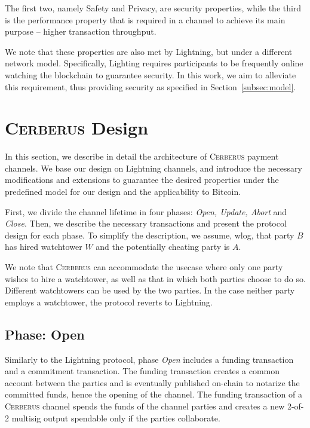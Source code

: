 \documentclass[runningheads]{llncs}
\newcommand{\authnote}[3]{{ \footnotesize \bf{#1[#2: #3]~}}} %
\newcommand{\edit}[1]{\authnote{\color{blue}}{edit}{#1}}
\newcommand{\sys}{\textsc{Cerberus}\xspace}
\begin{document}
The first two, namely Safety and Privacy, are security properties, while the third is the performance property that is required in a channel to achieve its main purpose -- higher transaction throughput.

We note that these properties are also met by Lightning, but under a different network model. Specifically, Lighting requires participants to be frequently online watching the blockchain to guarantee security. In this work, we aim to alleviate this requirement, thus providing security as specified in Section~\ref{subsec:model}.






\section{\sys Design}\label{sec:design}

In this section, we describe in detail the architecture of \sys payment channels. We base our design on Lightning channels, and introduce the necessary modifications and extensions to guarantee the desired properties under the predefined model for our design and the applicability to Bitcoin.

First, we divide the channel lifetime in four phases: \textit{Open, Update, Abort} and \textit{Close}. Then, we describe the necessary transactions  and present the protocol design for each phase.
To simplify the description, we assume, wlog, that party $B$ has hired watchtower $W$ and the potentially cheating party is $A$.

We note that \sys can accommodate the usecase where only one party wishes to hire a watchtower, as well as that in which both parties choose to do so. Different watchtowers can be used by the two parties. In the case neither party employs a watchtower, the protocol reverts to Lightning.


\subsection{Phase: Open}\label{subsec:open}
Similarly to the Lightning protocol, phase \textit{Open} includes a funding transaction and a commitment transaction.
The funding transaction creates a common account between the parties and is eventually published on-chain to notarize the committed funds, hence the opening of the channel. The funding transaction of a \sys channel spends the funds of the channel parties and creates a new 2-of-2 multisig output spendable only if the parties collaborate.
\end{document}
